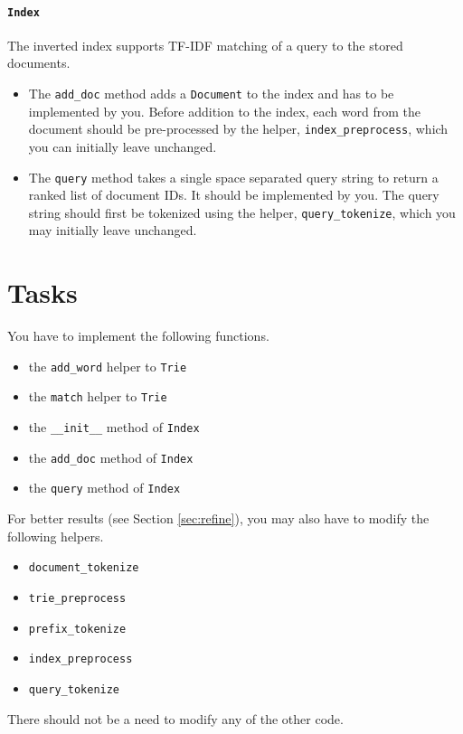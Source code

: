 \documentclass[addpoints]{exam}
\begin{document}
\paragraph{\texttt{Index}} The inverted index supports TF-IDF matching of a query to the stored documents.
\begin{itemize}
\item The \texttt{add\_doc} method adds a \texttt{Document} to the index and has to be implemented by you. Before addition to the index, each word from the document should be pre-processed by the helper, \texttt{index\_preprocess}, which you can initially leave unchanged.
\item The \texttt{query} method takes a single space separated query string to return a ranked list of document IDs. It should be implemented by you. The query string should first be tokenized using the helper, \texttt{query\_tokenize}, which you may initially leave unchanged.
\end{itemize}

\section{Tasks}

You have to implement the following functions.
\begin{itemize}
\item the \texttt{add\_word} helper to \texttt{Trie}
\item the \texttt{match} helper to \texttt{Trie}
\item the \texttt{\_\_init\_\_} method of \texttt{Index}
\item the \texttt{add\_doc} method of \texttt{Index}
\item the \texttt{query} method of \texttt{Index}
\end{itemize}

\noindent For better results (see Section \ref{sec:refine}), you may also have to modify the following helpers.
\begin{itemize}
\item \texttt{document\_tokenize}
\item \texttt{trie\_preprocess}
\item \texttt{prefix\_tokenize}
\item \texttt{index\_preprocess}
\item \texttt{query\_tokenize}
\end{itemize}

\noindent There should not be a need to modify any of the other code.
\end{document}
